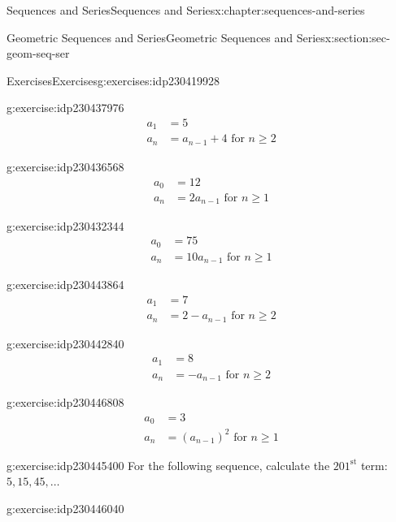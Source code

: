 \documentclass[twoside,10pt,]{book}
\numberwithin{equation}{section}
\newcommand{\upst}[1]{{#1^{\text{st}}}}
\newcommand{\amp}{&}
\begin{document}
\begin{chapterptx}{Sequences and Series}{}{Sequences and Series}{}{}{x:chapter:sequences-and-series}
\begin{sectionptx}{Geometric Sequences and Series}{}{Geometric Sequences and Series}{}{}{x:section:sec-geom-seq-ser}
\begin{exercises-subsection}{Exercises}{}{Exercises}{}{}{g:exercises:idp230419928}
\begin{exercisegroup}
\begin{divisionexerciseeg}{13}{}{}{g:exercise:idp230437976}
%
\begin{align*}
a_1\amp = 5\\
a_n \amp = a_{n - 1} + 4   \text{   for } n \ge 2
\end{align*}
\end{divisionexerciseeg}%
\begin{divisionexerciseeg}{14}{}{}{g:exercise:idp230436568}%
%
\begin{align*}
a_0 \amp = 12\\
a_n \amp = 2a_{n-1} \text{   for } n\ge 1
\end{align*}
\end{divisionexerciseeg}%
\begin{divisionexerciseeg}{15}{}{}{g:exercise:idp230432344}%
%
\begin{align*}
a_0\amp = 75\\
a_n\amp = 10a_{n-1} \text{   for } n\ge 1
\end{align*}
\end{divisionexerciseeg}%
\begin{divisionexerciseeg}{16}{}{}{g:exercise:idp230443864}%
%
\begin{align*}
a_1 \amp = 7\\
a_n\amp = 2-a_{n-1} \text{   for } n\ge 2
\end{align*}
\end{divisionexerciseeg}%
\begin{divisionexerciseeg}{17}{}{}{g:exercise:idp230442840}%
%
\begin{align*}
a_1 \amp = 8\\
a_n \amp = -a_{n-1} \text{   for } n\ge 2
\end{align*}
\end{divisionexerciseeg}%
\begin{divisionexerciseeg}{18}{}{}{g:exercise:idp230446808}%
%
\begin{align*}
a_0 \amp = 3\\
a_n\amp = (a_{n-1})^2 \text{   for } n\ge 1
\end{align*}
\end{divisionexerciseeg}%
\end{exercisegroup}
\par\medskip\noindent
\begin{divisionexercise}{19}{}{}{g:exercise:idp230445400}%
For the following sequence, calculate the \(\upst{201}\) term:  \(5, 15, 45, \ldots\)\end{divisionexercise}%
\begin{divisionexercise}{20}{}{}{g:exercise:idp230446040}%

\end{divisionexercise}
\end{exercises-subsection}
\end{sectionptx}
\end{chapterptx}
\end{document}
